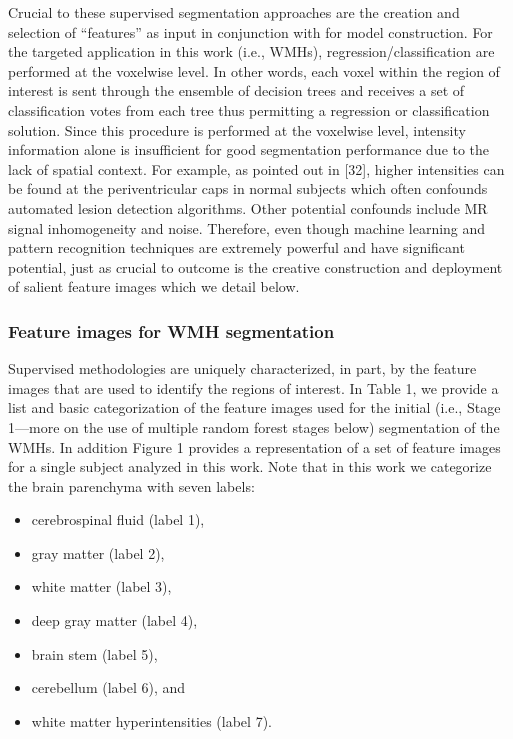 \documentclass[11pt,]{article}
\providecommand{\tightlist}{%
  \setlength{\itemsep}{0pt}\setlength{\parskip}{0pt}}
\begin{document}
Crucial to these supervised segmentation approaches are the creation and
selection of ``features'' as input in conjunction with
 for model
construction. For the targeted application in this work (i.e., WMHs),
regression/classification are performed at the voxelwise level. In other
words, each voxel within the region of interest is sent through the
ensemble of decision trees and receives a set of classification votes
from each tree thus permitting a regression or classification solution.
Since this procedure is performed at the voxelwise level, intensity
information alone is insufficient for good segmentation performance due
to the lack of spatial context. For example, as pointed out in {[}32{]},
higher intensities can be found at the periventricular caps in normal
subjects which often confounds automated lesion detection algorithms.
Other potential confounds include MR signal inhomogeneity and noise.
Therefore, even though machine learning and pattern recognition
techniques are extremely powerful and have significant potential, just
as crucial to outcome is the creative construction and deployment of
salient feature images which we detail below.

\subsubsection{Feature images for WMH
segmentation}\label{feature-images-for-wmh-segmentation}



Supervised methodologies are uniquely characterized, in part, by the
feature images that are used to identify the regions of interest. In
Table 1, we provide a list and basic categorization of the feature
images used for the initial (i.e., Stage 1---more on the use of multiple
random forest stages below) segmentation of the WMHs. In addition Figure
1 provides a representation of a set of feature images for a single
subject analyzed in this work. Note that in this work we categorize the
brain parenchyma with seven labels:

\begin{itemize}
\tightlist
\item
  cerebrospinal fluid (label 1),
\item
  gray matter (label 2),
\item
  white matter (label 3),
\item
  deep gray matter (label 4),
\item
  brain stem (label 5),
\item
  cerebellum (label 6), and
\item
  white matter hyperintensities (label 7).
\end{itemize}
\end{document}
